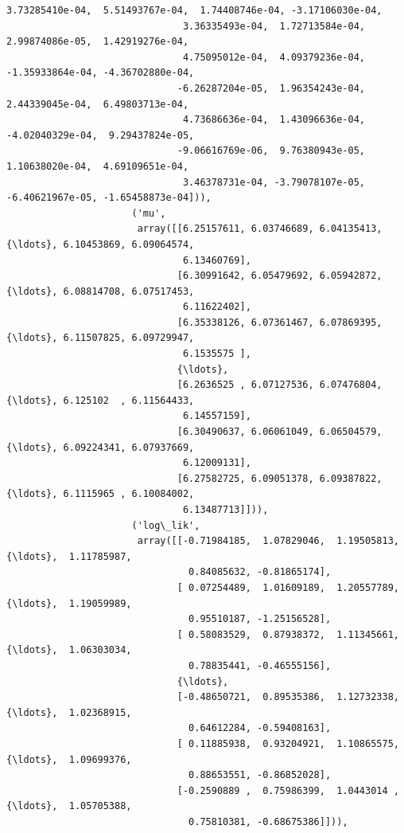 \documentclass[11pt]{article}
\begin{document}
\begin{Verbatim}[commandchars=\\\{\}]
                               3.73285410e-04,  5.51493767e-04,  1.74408746e-04, -3.17106030e-04,
                               3.36335493e-04,  1.72713584e-04,  2.99874086e-05,  1.42919276e-04,
                               4.75095012e-04,  4.09379236e-04, -1.35933864e-04, -4.36702880e-04,
                              -6.26287204e-05,  1.96354243e-04,  2.44339045e-04,  6.49803713e-04,
                               4.73686636e-04,  1.43096636e-04, -4.02040329e-04,  9.29437824e-05,
                              -9.06616769e-06,  9.76380943e-05,  1.10638020e-04,  4.69109651e-04,
                               3.46378731e-04, -3.79078107e-05, -6.40621967e-05, -1.65458873e-04])),
                      ('mu',
                       array([[6.25157611, 6.03746689, 6.04135413, {\ldots}, 6.10453869, 6.09064574,
                               6.13460769],
                              [6.30991642, 6.05479692, 6.05942872, {\ldots}, 6.08814708, 6.07517453,
                               6.11622402],
                              [6.35338126, 6.07361467, 6.07869395, {\ldots}, 6.11507825, 6.09729947,
                               6.1535575 ],
                              {\ldots},
                              [6.2636525 , 6.07127536, 6.07476804, {\ldots}, 6.125102  , 6.11564433,
                               6.14557159],
                              [6.30490637, 6.06061049, 6.06504579, {\ldots}, 6.09224341, 6.07937669,
                               6.12009131],
                              [6.27582725, 6.09051378, 6.09387822, {\ldots}, 6.1115965 , 6.10084002,
                               6.13487713]])),
                      ('log\_lik',
                       array([[-0.71984185,  1.07829046,  1.19505813, {\ldots},  1.11785987,
                                0.84085632, -0.81865174],
                              [ 0.07254489,  1.01609189,  1.20557789, {\ldots},  1.19059989,
                                0.95510187, -1.25156528],
                              [ 0.58083529,  0.87938372,  1.11345661, {\ldots},  1.06303034,
                                0.78835441, -0.46555156],
                              {\ldots},
                              [-0.48650721,  0.89535386,  1.12732338, {\ldots},  1.02368915,
                                0.64612284, -0.59408163],
                              [ 0.11885938,  0.93204921,  1.10865575, {\ldots},  1.09699376,
                                0.88653551, -0.86852028],
                              [-0.2590889 ,  0.75986399,  1.0443014 , {\ldots},  1.05705388,
                                0.75810381, -0.68675386]])),

\end{Verbatim}
\end{document}
